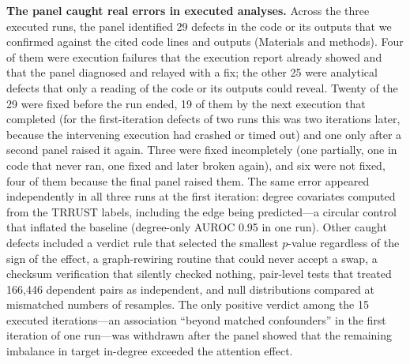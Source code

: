 \documentclass[10pt,letterpaper]{article}
\begin{document}
\textbf{The panel caught real errors in executed analyses.} Across the three executed runs, the panel identified 29 defects in the code or its outputs that we confirmed against the cited code lines and outputs (Materials and methods). Four of them were execution failures that the execution report already showed and that the panel diagnosed and relayed with a fix; the other 25 were analytical defects that only a reading of the code or its outputs could reveal. Twenty of the 29 were fixed before the run ended, 19 of them by the next execution that completed (for the first-iteration defects of two runs this was two iterations later, because the intervening execution had crashed or timed out) and one only after a second panel raised it again. Three were fixed incompletely (one partially, one in code that never ran, one fixed and later broken again), and six were not fixed, four of them because the final panel raised them. The same error appeared independently in all three runs at the first iteration: degree covariates computed from the TRRUST labels, including the edge being predicted---a circular control that inflated the baseline (degree-only AUROC 0.95 in one run). Other caught defects included a verdict rule that selected the smallest $p$-value regardless of the sign of the effect, a graph-rewiring routine that could never accept a swap, a checksum verification that silently checked nothing, pair-level tests that treated 166,446 dependent pairs as independent, and null distributions compared at mismatched numbers of resamples. The only positive verdict among the 15 executed iterations---an association ``beyond matched confounders'' in the first iteration of one run---was withdrawn after the panel showed that the remaining imbalance in target in-degree exceeded the attention effect.
\end{document}
